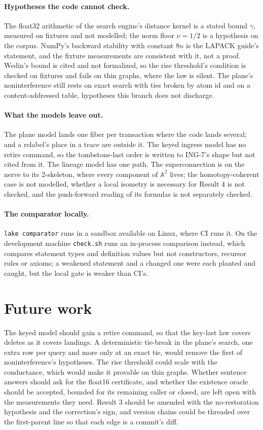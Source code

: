 \documentclass[11pt]{article}
\theoremstyle{plain}
\theoremstyle{definition}
\theoremstyle{remark}
\newcommand{\A}{\mathbb{A}}
\begin{document}
\paragraph{Hypotheses the code cannot check.} The float32 arithmetic of the search engine's
distance kernel is a stated bound $\gamma$, measured on fixtures and not modelled; the norm floor
$\nu = 1/2$ is a hypothesis on the corpus. NumPy's backward stability with constant $8n$ is the
LAPACK guide's statement, and the fixture measurements are consistent with it, not a proof.
Wedin's bound is cited and not formalized, so the rise threshold's condition is checked on
fixtures and fails on thin graphs, where the law is silent. The plane's noninterference still
rests on exact search with ties broken by atom id and on a content-addressed table, hypotheses
this branch does not discharge.

\paragraph{What the models leave out.} The plane model lands one fiber per transaction where the
code lands several;  and a relabel's place in a trace are outside it. The keyed ingress
model has no retire command, so the tombstone-last order is written to ING-7's shape but not
cited from it. The lineage model has one path. The superconnection is on the nerve to its
2-skeleton, where every component of $\A^2$ lives; the homotopy-coherent case is not modelled,
whether a local isometry is necessary for Result 4 is not checked, and the push-forward reading
of its formulas is not separately checked.

\paragraph{The comparator locally.} \texttt{lake comparator} runs in a sandbox available on Linux,
where CI runs it. On the development machine \texttt{check.sh} runs an in-process comparison
instead, which compares statement types and definition values but not constructors, recursor
rules or axioms; a weakened statement and a changed one were each planted and caught, but the
local gate is weaker than CI's.

\section{Future work}

The keyed model should gain a retire command, so that the key-last law covers deletes as it covers
landings. A deterministic tie-break in the plane's search, one extra row per query and more only
at an exact tie, would remove the first of noninterference's hypotheses. The rise threshold could
scale with the conductance, which would make it provable on thin graphs. Whether sentence answers
should ask for the float16 certificate, and whether the existence oracle should be accepted,
bounded for its remaining caller or closed, are left open with the measurements they need. Result
3 should be amended with the no-restoration hypothesis and the correction's sign, and version
chains could be threaded over the first-parent line so that each edge is a commit's diff.
\end{document}
